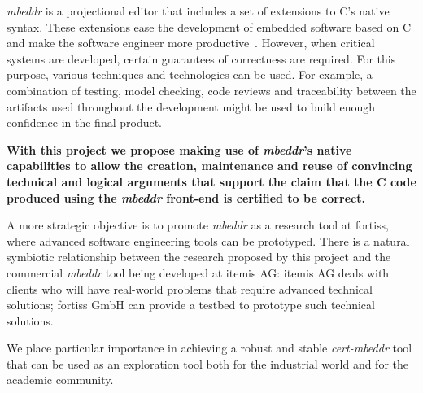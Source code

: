 \emph{mbeddr} is a projectional editor that includes a set of extensions to C's
native syntax. These extensions ease the development of embedded software based
on C and make the software engineer more
productive~\cite{VoelterRKS13}.
However, when critical systems are developed, certain guarantees of correctness
are required. For this purpose, various techniques and technologies
can be used. For example, a combination of testing, model checking, code
reviews and traceability between the artifacts used throughout the development
might be used to build enough confidence in the final product.

\vspace{2mm}
\noindent
\textbf{With this project we propose making use of \emph{mbeddr}'s native capabilities
to allow the creation, maintenance and reuse of convincing technical and logical
arguments that support the claim that the C code produced using the
\emph{mbeddr} front-end is certified to be correct.} 

\vspace{2mm}
\noindent
A more strategic objective is to promote \emph{mbeddr} as a research tool
at fortiss, where advanced software engineering tools can be prototyped. There
is a natural symbiotic relationship between the research proposed by this project and
the commercial \emph{mbeddr} tool being developed at itemis AG:
itemis AG deals with clients who will have real-world problems that require
advanced technical solutions; fortiss GmbH can provide a testbed to prototype
such technical solutions.
% 

We place particular importance in achieving a robust and stable
\emph{cert-mbeddr} tool that can be used as an exploration tool both for
the industrial world and for the academic community.
